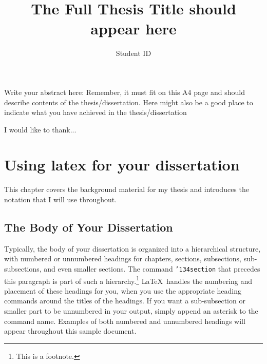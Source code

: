 \documentclass[12pt,MSc,a4paper,oneside]{muthesis}
\newcommand{\detailtexcount}[1]{%
  \immediate\write18{texcount -merge -sum #1.tex > #1.wcdetail }%
}
\newcommand{\quickwordcount}[1]{%
  \immediate\write18{texcount -1 -sum -merge #1.tex > #1-words.sum }%
   words%
}
\newcommand{\quickcharcount}[1]{%
  \immediate\write18{texcount -1 -sum -merge -char #1.tex > #1-chars.sum }%
   characters (not including spaces)%
}
\begin{document}
\title{The Full Thesis Title should appear here}
\author{Student ID}
\def\wordcount{\quickwordcount{main}}





 
\beforeabstract

 Write your abstract here: Remember, it must fit on this A4 page and should
 describe contents of the thesis/dissertation. Here might also be a good place
 to indicate what you have achieved in the thesis/dissertation

\afterabstract

I would like to thank...

\afterpreface



\chapter{Using latex for your dissertation}

This chapter covers the background material for my thesis and introduces
the notation that I will use throughout.

\section{The Body of Your Dissertation}
Typically, the body of your dissertation is organized into a hierarchical
structure, with numbered or unnumbered headings for chapters, sections,
subsections, sub-subsections, and even smaller sections.  The command
\texttt{{\char'134}section} that precedes this paragraph is part of
such a hierarchy.\footnote{This is a footnote.} \LaTeX\ handles the
numbering and placement of these headings for you, when you use the
appropriate heading commands around the titles of the headings.  If
you want a sub-subsection or smaller part to be unnumbered in your
output, simply append an asterisk to the command name.  Examples of
both numbered and unnumbered headings will appear throughout this sample document.
\end{document}
